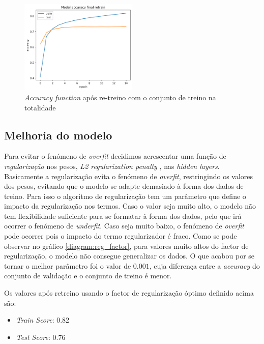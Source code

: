 \begin{figure}[t]
\begin{center}
\includegraphics[width=0.5\textwidth,keepaspectratio]{figures/50_final_png_first.png}
\caption{\textit{Accuracy function} após re-treino com o conjunto de treino na totalidade}
\label{diagram:accuracy_retrain}
\centering
\end{center}
\end{figure}

\subsection{Melhoria do modelo}

Para evitar o fenómeno de \textit{overfit} decidimos acrescentar uma função de \textit{regularização} nos pesos, \textit{L2 regularization penalty} \cite{l2_regularizer}, nas \textit{hidden layers}. Basicamente a regularização evita o fenómeno de \textit{overfit}, restringindo os valores dos pesos, evitando que o modelo se adapte demasiado à forma dos dados de treino.
Para isso o algoritmo de regularização tem um parâmetro que define o impacto da regularização nos termos. Caso o valor seja muito alto, o modelo não tem flexibilidade suficiente para se formatar à forma dos dados, pelo que irá ocorrer o fenómeno de \textit{underfit}. Caso seja muito baixo, o fenómeno de \textit{overfit} pode ocorrer pois o impacto do termo regularizador é fraco.
Como se pode observar no gráfico \ref{diagram:reg_factor}, para valores muito altos do factor de regularização, o modelo não consegue generalizar os dados. O que acabou por se tornar o melhor parâmetro foi o valor de $0.001$, cuja diferença entre a \textit{accuracy} do conjunto de validação e o conjunto de treino é menor.

Os valores após retreino usando o factor de regularização óptimo definido acima são:
\begin{itemize}
        \item \textit{Train Score}: 0.82
        \item \textit{Test Score}: 0.76
\end{itemize}

